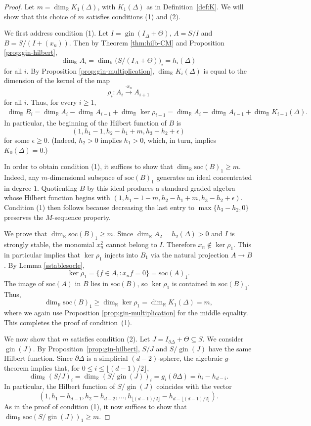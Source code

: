 \documentclass[11pt]{article}
\theoremstyle{definition}
\numberwithin{equation}{theorem}
\DeclareMathOperator{\gin}{gin}
\newcommand{\kk}{{\mathbb R}}
\newcommand{\Soc}{\mathrm{soc}}
\begin{document}
\begin{proof}
Let $m=\dim_{\kk}K_1(\Delta)$, with $K_1(\Delta)$ as in Definition~\ref{def:K}. We will show that this choice of $m$ satisfies conditions (1) and (2).

We first address condition (1). Let $I=\gin(I_\Delta+\Theta)$, $A=S/I$ and $B=S/(I+(x_n))$. Then by Theorem \ref{thm:hilb-CM} and Proposition \ref{prop:gin-hilbert},
\[
\dim_\kk A_i= \dim_\kk \big(S/(I_\Delta+\Theta)\big)_i=h_i(\Delta)
\]
for all $i$.
By Proposition \ref{prop:gin-multiplication}, $\dim_\kk K_i(\Delta)$ is equal to the dimension of the kernel of the map
\[
\rho_i : A_i \stackrel {\cdot x_n}\longrightarrow  A_{i+1}
\]
for all $i$. Thus, for every $i\geq 1$,
\begin{align*}
    \dim_\kk B_i = \dim_\kk A_i - \dim_\kk A_{i-1} + \dim_\kk \ker \rho_{i-1}
    = \dim_\kk A_i - \dim_\kk A_{i-1} + \dim_\kk K_{i-1}(\Delta).
\end{align*}
In particular, the beginning of the Hilbert function of $B$ is
\[
(1,h_1-1,h_2-h_1+m,h_3-h_2+\epsilon)
\]
for some $\epsilon\geq 0$. (Indeed, $h_2>0$ implies $h_1>0$, which, in turn, implies $K_0(\Delta)=0$.) 

In order to obtain condition (1), it suffices to show that $\dim_\kk\Soc(B)_1\geq m$. Indeed, any $m$-dimensional subspace of $\Soc(B)_1$ generates an ideal concentrated in degree $1$. Quotienting $B$ by this ideal produces a standard graded algebra whose Hilbert function begins with $(1,h_1-1-m,h_2-h_1+m,h_3-h_2+\epsilon)$. Condition (1) then follows because decreasing the last entry to $\max\{h_3-h_2,0\}$ preserves the $M$-sequence property.

We prove that $\dim_\kk \Soc(B)_1 \geq m$.
Since $\dim_\kk A_2=h_2(\Delta)>0$ and $I$ is strongly stable, the monomial $x_n^2$ cannot belong to $I$. Therefore $x_n \not \in \ker \rho_1$.
This in particular implies that $\ker \rho_1$ injects into $B_1$ via the natural projection $A \to B$.
By Lemma \ref{sstablesocle},
\[
\ker \rho_1=\{ f \in A_1 : x_n f=0\}=\Soc(A)_1.
\]
The image of $\Soc(A)$ in $B$ lies in $\Soc(B)$, so $\ker \rho_1$ is contained in $\Soc(B)_1$.
Thus,
\[\dim_\kk \Soc (B)_1 \geq \dim_\kk \ker \rho_1 =\dim_\kk K_1(\Delta)=m,\]
where we again use Proposition \ref{prop:gin-multiplication} for the middle equality. This completes the proof of condition~(1).








We now show that $m$ satisfies condition (2). Let $J=I_{\partial\Delta}+\Theta\subseteq S$. We consider $\gin (J)$. By Proposition~\ref{prop:gin-hilbert}, $S/J$ and $S/\gin(J)$ have the same Hilbert function. Since $\partial\Delta$ is a simplicial $(d-2)$-sphere, the algebraic $g$-theorem implies that, for $0\le i\le\lfloor(d-1)/2\rfloor$,
\[
\dim_\kk(S/J)_i=\dim_\kk(S/\gin(J))_i=g_i(\partial\Delta)=h_i-h_{d-i}.
\]
In particular, the Hilbert function of $S/\gin(J)$ coincides with the vector
\[
(1, h_1-h_{d-1}, h_2-h_{d-2}, \ldots, h_{\lfloor (d-1)/2 \rfloor}-h_{d-\lfloor (d-1)/2 \rfloor}).
\]
As in the proof of condition (1), it now suffices to show that $\dim_\kk\Soc(S/\gin(J))_1\ge m$.


\end{proof}
\end{document}
